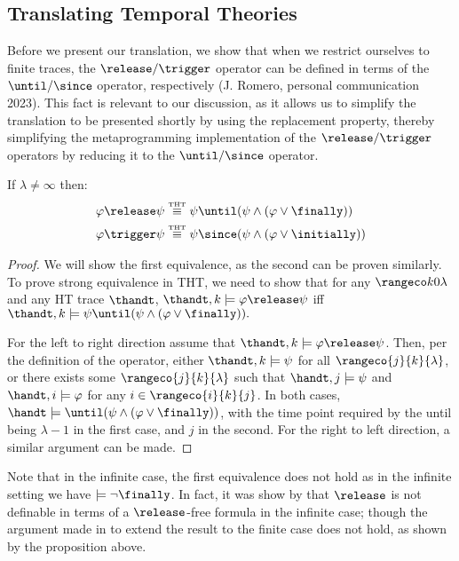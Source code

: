 \subsection{Translating Temporal Theories}

Before we present our translation, we show that when we restrict
ourselves to finite traces, the $\release/\trigger$ operator can be
defined in terms of the $\until/\since$ operator, respectively
(J. Romero, personal communication 2023).  This fact is relevant to
our discussion, as it allows us to simplify the translation to be
presented shortly by using the replacement property, thereby
simplifying the metaprogramming implementation of the
$\release/\trigger$ operators by reducing it to the $\until/\since$
operator.

\begin{proposition}

If $\lambda \neq \infty$ then:
\begin{align*}
\varphi \release \psi &\equivtht \psi \until (\psi \wedge (\varphi \vee \finally)) \\
\varphi \trigger \psi &\equivtht \psi \since (\psi \wedge (\varphi \vee \initially))
\end{align*}
\end{proposition}
\begin{proof}
  We will show the first equivalence, as the second can be proven
  similarly.  To prove strong equivalence in THT, we need to show that
  for any $\kinlambda$ and any HT trace $\thandt$,
  $\thandt,k \models \varphi \release \psi$ iff
  $\thandt,k \models \psi \until (\psi \wedge (\varphi \vee
  \finally)).$

  For the left to right direction assume that
  $\thandt,k \models \varphi \release \psi$. Then, per the definition
  of the operator, either $\thandt,k \models \psi$ for all
  $\rangeco{j}{k}{\lambda}$, or there exists some
  $\rangeco{j}{k}{\lambda}$ such that $\handt,j \models \psi$ and
  $\handt,i \models \varphi$ for any $i \in \rangeco{i}{k}{j}$. In
  both cases,
  $\handt \models \until (\psi \wedge (\varphi \vee \finally))$, with
  the time point required by the until being $\lambda-1$ in the first
  case, and $j$ in the second. For the right to left direction, a
  similar argument can be made.
\end{proof}

Note that in the infinite case, the first equivalence does not hold as
in the infinite setting we have $\models \neg \finally$. In fact, it
was show by \cite{babodife20a} that $\release$ is not definable in
terms of a $\release$-free formula in the infinite case; though the
argument made in \cite[p. 20]{agcadipescscvi20a} to extend the result
to the finite case does not hold, as shown by the proposition above.

